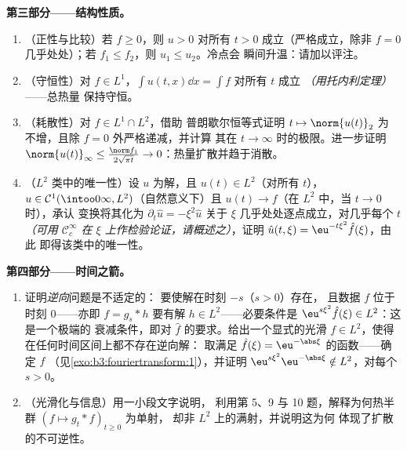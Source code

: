 \begin{problem}[{周末问题——$\partial_tu =
\partial^2_{xx}u$，从头到尾求解}]
\medskip
\noindent\textbf{第三部分——结构性质。}
\begin{enumerate}[resume]
  \item （正性与比较）若 $f \geq 0$，则 $u > 0$
        对所有 $t > 0$ 成立（严格成立，除非 $f = 0$ 几乎处处）；若
        $f_1 \leq f_2$，则 $u_1 \leq u_2$。冷点会
        瞬间升温：请加以评注。
  \item （守恒性）对 $f \in L^1$，$\int u(t, x)\dd x =
        \int f$ 对所有 $t$ 成立 \emph{（用托内利定理）}——总热量
        保持守恒。
  \item （耗散性）对 $f \in L^1\cap L^2$，借助
        普朗歇尔恒等式证明 $t \mapsto \norm{u(t)}_2$ 为
        不增，且除 $f = 0$ 外严格递减，并计算
        其在 $t \to \infty$ 时的极限。进一步证明
        $\norm{u(t)}_\infty \leq \frac{\norm
        f_1}{2\sqrt{\pi t}} \to 0$：热量扩散并趋于消散。
  \item （$L^2$ 类中的唯一性）设 $u$ 为解，且
        $u(t) \in L^2$（对所有 $t$），$u \in \mathcal
        C^1(\intoo0\infty, L^2)$（自然意义下）且
        $u(t) \to f$（在 $L^2$ 中，当 $t\to0$ 时），承认
        变换将其化为 $\partial_t\hat u =
        -\xi^2\hat u$ 关于 $\xi$ 几乎处处逐点成立，对几乎每个 $t$
        \emph{（可用 $\mathcal
        C_c^\infty$ 在 $\xi$ 上作检验论证，请概述之）}，证明
        $\hat u(t,\xi) = \eu^{-t\xi^2}\hat f(\xi)$，由此
        即得该类中的唯一性。
\end{enumerate}

\medskip
\noindent\textbf{第四部分——时间之箭。}
\begin{enumerate}[resume]
  \item 证明\emph{逆向}问题是不适定的：
        要使解在时刻 $-s$（$s > 0$）存在，
        且数据 $f$ 位于时刻 $0$——亦即 $f = g_s * h$
        要有解 $h \in L^2$——必要条件是
        $\eu^{s\xi^2}\hat f(\xi) \in L^2$：这是一个极端的
        衰减条件，即对 $\hat f$ 的要求。给出一个显式的光滑 $f
        \in L^2$，使得在任何时间区间上都不存在逆向解：
        取满足 $\hat f(\xi) =
        \eu^{-\abs\xi}$ 的函数——确定 $f$
        （见\cref{exo:b3:fouriertransform:1}），并证明
        $\eu^{s\xi^2}\eu^{-\abs\xi} \notin L^2$，对每个 $s >
        0$。
  \item （光滑化与信息）用一小段文字说明，
        利用第 5、9 与 10 题，解释为何热半群
        $(f \mapsto g_t * f)_{t\geq0}$ 为单射，
        却非 $L^2$ 上的满射，并说明这为何
        体现了扩散的不可逆性。
\end{enumerate}


\end{problem}
